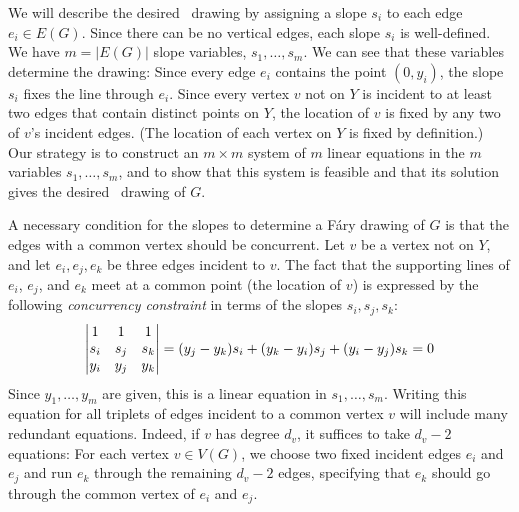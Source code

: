 
We will describe the desired \Fary\ drawing by assigning a slope $s_i$
to each edge $e_i\in E(G)$.   Since there can be no vertical edges,
each slope $s_i$ is well-defined. We have $m=|E(G)|$ slope variables,
$s_1,\ldots,s_m$. 
We can see that these variables determine the drawing:
 Since every edge $e_i$ contains the point $(0,y_i)$,
the slope $s_i$ fixes the line through $e_i$.  Since every vertex $v$
not on $Y$ is incident to at least two edges that contain distinct points
on $Y$, the location of $v$ is fixed by any two of $v$'s incident edges.  
(The location of each vertex on
$Y$ is fixed by definition.)  Our strategy is to construct an $m\times m$
system of $m$ linear equations in the $m$ variables $s_1,\ldots,s_m$,
and to show that
this system is feasible and that its solution gives the desired \Fary\
drawing of $G$.

A necessary condition for the slopes to determine a F\'ary drawing of
$G$ is that the %
edges 
with a common vertex should be concurrent. Let $v$ be a vertex 
not on $Y$, and let $e_i, e_j, e_k$ be three edges incident to $v$.
The fact that the supporting lines of $e_i$, $e_j$, and $e_k$
meet at a common point (the location of $v$) is expressed by the following
\emph{concurrency constraint} in terms of the slopes $s_i,s_j,s_k$:
\begin{equation}\eqlabel{slope0} 
\left|
\begin{matrix}
1&1&1\\
s_i&s_j&s_k\\
y_i&y_j&y_k
\end{matrix}
\right|=
({y_j-y_k}) s_i + ({y_k-y_i}) s_j 
+ ({y_i-y_j})s_k  = 0
\end{equation}
Since $y_1,\ldots,y_m$ are given, this is a linear equation
in $s_1,\ldots,s_m$.
Writing this equation for all triplets of edges incident to a common
vertex $v$ will include many redundant equations. Indeed,
if $v$ has degree $d_v$,
it suffices to take $d_v-2$ equations: For each vertex $v\in V(G)$, we choose two fixed
incident edges $e_i$ and $e_j$ and run $e_k$ through the remaining
$d_v-2$ edges, specifying that $e_k$ should go through the common vertex
of $e_i$ and $e_j$.


